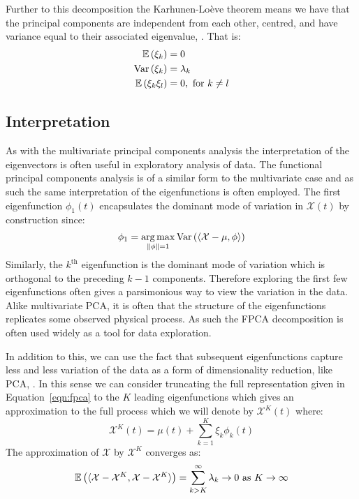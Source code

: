 Further to this decomposition the Karhunen-Lo\`{e}ve theorem means we have that the principal components are independent from each other, centred, and have variance equal to their associated eigenvalue, \citep{karhunen_zur_1946, loeve_fonctions_1946}.
That is:
\begin{align}
	\operatorname{\mathbb{E}}\left(\xi_k\right) &= 0 \\
	\text{Var}\left(\xi_k\right) &= \lambda_k \\
	\operatorname{\mathbb{E}}\left(\xi_k \xi_l\right) &= 0,~\text{for}~ k \ne l \label{eqn:principal_comp_uncorr}
\end{align}

\subsection{Interpretation}
As with the multivariate principal components analysis the interpretation of the eigenvectors is often useful in exploratory analysis of data.
The functional principal components analysis is of a similar form to the multivariate case and as such the same interpretation of the eigenfunctions is often employed.
The first eigenfunction $\phi_1(t)$ encapsulates the dominant mode of variation in $\mathcal{X}(t)$ by construction since:
\begin{equation}\label{eqn:first_comp}
	\phi_1 = \operatorname*{arg\,max}_{\lVert \phi \rVert=1} \text{Var}\left( \langle  \mathcal{X} - \mu, \phi \rangle  \right)
\end{equation}
Similarly, the $k^\text{th}$ eigenfunction is the dominant mode of variation which is orthogonal to the preceding $k-1$ components.
Therefore exploring the first few eigenfunctions often gives a parsimonious way to view the variation in the data.
Alike multivariate PCA, it is often that the structure of the eigenfunctions replicates some observed physical process.
As such the FPCA decomposition is often used widely as a tool for data exploration. 

In addition to this, we can use the fact that subsequent eigenfunctions capture less and less variation of the data as a form of dimensionality reduction, like PCA, \citep{wold_principal_1987}.
In this sense we can consider truncating the full representation given in Equation~\eqref{eqn:fpca} to the $K$ leading eigenfunctions which gives an approximation to the full process which we will denote by $\mathcal{X}^K(t)$ where:
\begin{equation}\label{eqn:fpca_trun}
	\mathcal{X}^K(t)  =   \mu(t) + \sum_{k=1}^{K}\xi_k \phi_k(t)
\end{equation}
The approximation of $\mathcal{X}$ by $\mathcal{X}^K$ converges as:
\begin{equation}\label{eqn:fpca_trun_conv}
	\operatorname{\mathbb{E}} \left( \langle  \mathcal{X} - \mathcal{X}^K, \mathcal{X} - \mathcal{X}^K \rangle \right)  =   \sum_{k > K}^{\infty} \lambda_k \to 0~\text{as}~K \to \infty
\end{equation}

